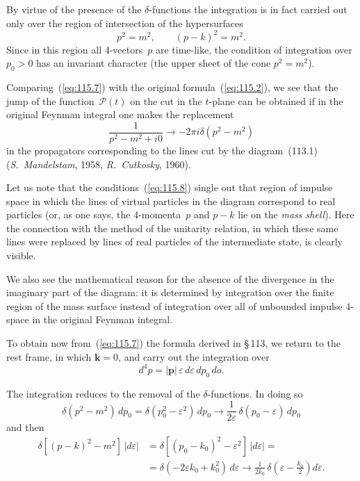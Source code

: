 By virtue of the presence of the $\delta$-functions the integration is in fact carried out only over the region of intersection of the hypersurfaces
\begin{equation}
p^2 = m^2, \qquad (p - k)^2 = m^2.
\label{eq:115.8}
\end{equation}
Since in this region all 4-vectors~$p$ are time-like, the condition of integration over $p_0 > 0$ has an invariant character (the upper sheet of the cone $p^2 = m^2$).


Comparing~(\ref{eq:115.7}) with the original formula~(\ref{eq:115.2}), we see that the jump of the function~$\mathcal{P}(t)$ on the cut in the $t$-plane can be obtained if in the original Feynman integral one makes the replacement
\begin{equation}
\frac{1}{p^2 - m^2 + i0} \to -2\pi i\delta(p^2 - m^2)
\label{eq:115.9}
\end{equation}
in the propagators corresponding to the lines cut by the diagram~(113.1) (\emph{S.~Mandelstam}, 1958, \emph{R.~Cutkosky}, 1960).

Let us note that the conditions~(\ref{eq:115.8}) single out that region of impulse space in which the lines of virtual particles in the diagram correspond to real particles (or, as one says, the 4-momenta~$p$ and $p - k$ lie on the \emph{mass shell}). Here the connection with the method of the unitarity relation, in which these same lines were replaced by lines of real particles of the intermediate state, is clearly visible.

We also see the mathematical reason for the absence of the divergence in the imaginary part of the diagram: it is determined by integration over the finite region of the mass surface instead of integration over all of unbounded impulse 4-space in the original Feynman integral.

To obtain now from~(\ref{eq:115.7}) the formula derived in \S\,113, we return to the rest frame, in which $\mathbf{k} = 0$, and carry out the integration over
\[
d^4p = |\mathbf{p}|\,\varepsilon\,d\varepsilon\,dp_0\,do.
\]

The integration reduces to the removal of the $\delta$-functions. In doing so
\[
\delta(p^2 - m^2)\,dp_0 = \delta(p_0^2 - \varepsilon^2)\,dp_0 \to \frac{1}{2\varepsilon}\,\delta(p_0 - \varepsilon)\,dp_0
\]
and then
\begin{align*}
\delta[(p - k)^2 - m^2]\,|d\varepsilon| &= \delta[(p_0 - k_0)^2 - \varepsilon^2]\,|d\varepsilon| = \\
&= \delta(-2\varepsilon k_0 + k_0^2)\,d\varepsilon \to \frac{1}{2k_0}\,\delta\!\left(\varepsilon - \frac{k_0}{2}\right)d\varepsilon.
\end{align*}

